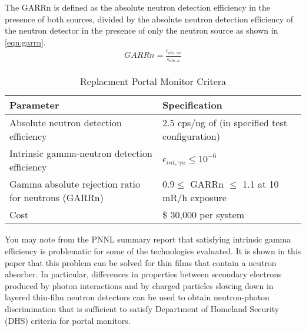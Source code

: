 \documentclass[draftcls,onecolumn]{IEEEtran}
\begin{document}
The GARRn is defined as the absolute neutron detection efficiency in the presence of both sources, divided by the absolute neutron detection efficiency of the neutron detector in the presence of only the neutron source as shown in \eqref{eqn:garrn}\cite{kouzes_neutron_1999}.
\begin{align}
  \label{eqn:garrn}
  GARRn = \frac{ \epsilon_{abs,\gamma n}}{\epsilon_{abs,n}}
\end{align}
\begin{table}
  \centering
	\caption{Replacment Portal Monitor Critera}
	\begin{tabular}{m{2.5cm} m{2.5cm} }
	Parameter & Specification \\
	\hline
	\hline
	Absolute neutron detection efficiency & 2.5 cps/ng of \iso[252]{Cf} (in specified test configuration) \\
	Intrinsic gamma-neutron detection efficiency & $ \epsilon_{int,\gamma n}\leq 10^{-6}$ \\
	Gamma absolute rejection ratio for neutrons (GARRn) & $ 0.9 \leq \text{ GARRn }\leq$ 1.1 at 10 mR/h exposure \\
	Cost &  \$ 30,000 per system \\
	\end{tabular}
	\label{tab:DHSCritera}
\end{table}

You may note from the PNNL summary report \cite{pnnl_18471}  that satisfying intrinsic gamma efficiency is problematic for some of the technologies evaluated.
It is shown in this paper that this problem can be solved for thin films that contain a neutron absorber.
In particular, differences in properties between secondary electrons produced by photon interactions and by charged particles slowing down in layered thin-film neutron detectors can be used to obtain neutron-photon discrimination that is sufficient to satisfy Department of Homeland Security (DHS) criteria for portal monitors.  


\end{document}
